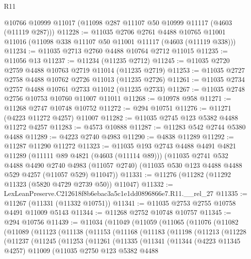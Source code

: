 \begin{lexlean}{R11}
\begin{coremodule}
    @10766
    @10999
    @11017
    (@11098 @287 @11107 @50 @10999 @11117 (@4603 (@11119 @287)))
@11228 := @11035
    @2706
    @2761
    @4488
    @10765
    @11001
    @11016
    (@11098 @338 @11107 @50 @11001 @11117 (@4603 (@11119 @338)))
@11234 := @11035 @2713 @2760 @4488 @10764 @2712 @11015
@11235 := @11056 @13
@11237 := @11234 (@11235 @2712)
@11245 := @11035 @2720 @2759 @4488 @10763 @2719 @11014 (@11235 @2719)
@11253 := @11035 @2727 @2758 @4488 @10762 @2726 @11013 (@11235 @2726)
@11261 := @11035 @2734 @2757 @4488 @10761 @2733 @11012 (@11235 @2733)
@11267 := @11035 @2748 @2756 @10753 @10760 @11007 @11011
@11268 := @10978 @958
@11271 := @11268 @2747 @10748 @10752
@11272 := @294 @10751
@11276 := @11271 (@4223 @11272 @4257) @11007
@11282 := @11035 @2745 @123 @5382 @4488 @11272 @4257
@11283 := @4573 @10888
@11287 := @11283 @542 @2744 @5380 @4488
@11289 := @4223 @2740 @4983
@11290 := @4838 @11289
@11292 := @11287 @11290 @11272
@11323 := @11035
    @193
    @2743
    @4488
    @4491
    @4821
    @11289
    (@11111 @89 @4821 (@4603 (@11114 @89)))
    (@11035
      @2741
      @532
      @4488
      @4490
      @2740
      @4983
      (@11057 @2740)
      (@11035 @530 @123 @4488 @4488 @529 @4257 (@11057 @529) @11047))
@11331 := @11276 (@11282 (@11292 @11323 (@5820 @4729 @2739 @50)) @11047)
@11332 := LexLeanPreserve.C212618f8b6ebac3a5c1e1dd0896866e7.R11.__rel_27
@11335 := @11267 (@11331 (@11332 @10751))
@11341 := @11035 @2753 @2755 @10758 @4491 @11009 @5143
@11344 := @11268 @2752 @10748 @10757
@11345 := @294 @10756
@11439 := @11034
    (@11049
      (@11059
        (@11065
          (@11076
            (@11082
              (@11089
                (@11123
                  (@11138
                    (@11153
                      (@11168
                        (@11183
                          (@11198
                            (@11213
                              (@11228
                                (@11237
                                  (@11245
                                    (@11253
                                      (@11261
                                        (@11335
                                          (@11341
                                            (@11344
                                              (@4223 @11345 @4257)
                                              @11009
                                              (@11035
                                                @2750
                                                @123
                                                @5382
                                                @4488

\end{coremodule}
\end{lexlean}
